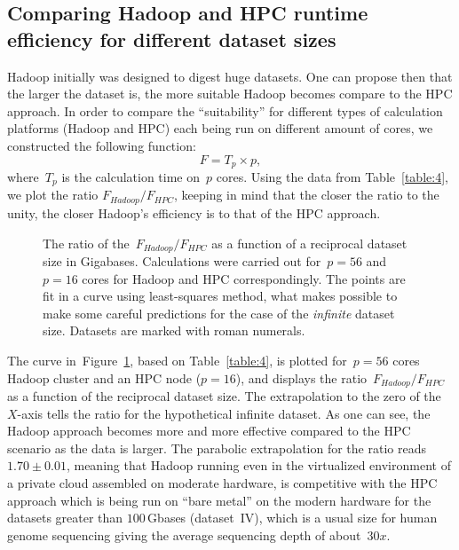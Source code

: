 \documentclass[11pt, oneside]{article}   	%
\begin{document}
\subsection{Comparing Hadoop and HPC runtime efficiency for different dataset sizes}
Hadoop initially was designed to digest huge datasets\cite{hadoop,lin2010}. One can propose then that the larger the dataset is, the more suitable Hadoop becomes compare to the HPC approach. In order to compare the ``suitability'' for different types of calculation platforms (Hadoop and HPC) each being run on different amount of cores, we constructed the following function:
$$F=T_{p}\times p,$$ 
where~$T_{p}$ is the calculation time on~$p$ cores.
Using the data from Table~\ref{table:4},  we plot the ratio $F_{Hadoop}/F_{HPC}$, keeping in mind that the closer the ratio to the unity, the closer Hadoop's efficiency is to that of the HPC approach.
\begin{figure}
	
	\caption{The ratio of the~$F_{Hadoop}/F_{HPC}$ as a function of a reciprocal dataset size in Gigabases.  Calculations were carried out for~$p=56$ and $p=16$ cores for Hadoop and HPC correspondingly.
The points are fit in a curve using least-squares method, what makes  possible to make some careful predictions for the case of the {\it infinite} dataset size. Datasets are marked with roman numerals.}
	\label{fig:fig2}
\end{figure}
The curve  in~Figure~\ref{fig:fig2}, based on Table~\ref{table:4}, is plotted for~$p=56$ cores Hadoop cluster and an HPC node ($p=16$), and displays the ratio~$F_{Hadoop}/F_{HPC}$ as a function of the reciprocal dataset size. The extrapolation to the zero of the~$X$-axis tells the ratio for the hypothetical infinite dataset. As one can see, the Hadoop approach becomes more  and more effective compared to the HPC scenario as the data is larger. 
The parabolic extrapolation for  the ratio reads~$1.70\pm0.01$, meaning that Hadoop running even  in the virtualized environment of a private cloud assembled on moderate hardware, is competitive with  the HPC approach which is being run on ``bare metal''  on the modern hardware for the datasets greater than $100$\,Gbases (dataset~IV), which is a usual size for human genome sequencing giving the average sequencing depth of  about~$30x$.
\end{document}
